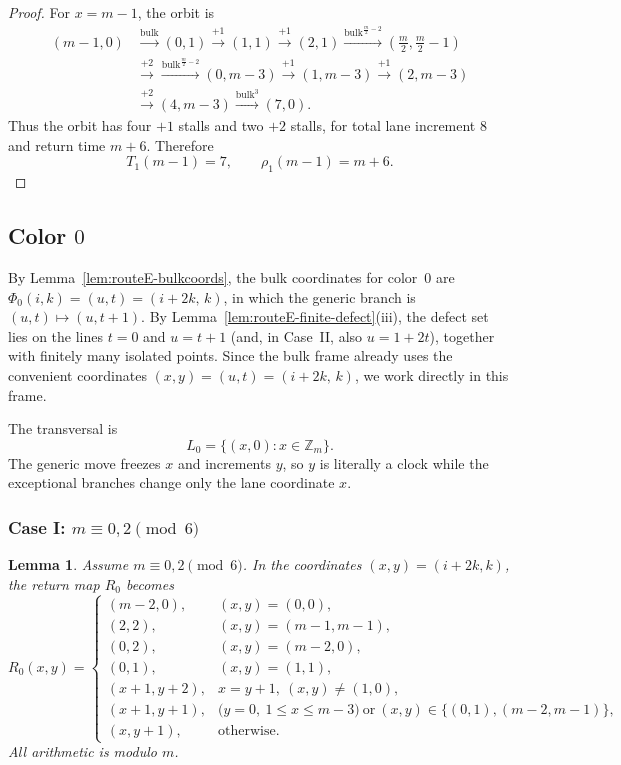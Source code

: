 \documentclass[11pt]{article}
\newtheorem{lemma}{Lemma}
\newcommand{\Zm}{\mathbb Z_m}
\newcommand{\bulk}{\mathrm{bulk}}   %
\begin{document}
\begin{proof}
For $x=m-1$, the orbit is
\[
\begin{aligned}
(m-1,0)&\xrightarrow{\bulk}(0,1)\xrightarrow{+1}(1,1)\xrightarrow{+1}(2,1)
\xrightarrow{\bulk^{\frac m2-2}}\left(\frac m2,\frac m2-1\right)\\
&\xrightarrow{+2}\xrightarrow{\bulk^{\frac m2-2}}(0,m-3)\xrightarrow{+1}(1,m-3)
\xrightarrow{+1}(2,m-3)\\
&\xrightarrow{+2}(4,m-3)\xrightarrow{\bulk^3}(7,0).
\end{aligned}
\]
Thus the orbit has four $+1$ stalls and two $+2$ stalls, for total lane increment $8$ and return time
$m+6$.
Therefore
\[
T_1(m-1)=7,\qquad \rho_1(m-1)=m+6.
\]
\end{proof}

\subsection{Color $0$}

By Lemma~\ref{lem:routeE-bulkcoords}, the bulk coordinates for color~$0$ are $\Phi_0(i,k)=(u,t)=(i+2k,\,k)$, in which the generic branch is $(u,t)\mapsto(u,t+1)$.
By Lemma~\ref{lem:routeE-finite-defect}\textup{(iii)}, the defect set lies on the lines $t=0$ and $u=t+1$ (and, in Case~II, also $u=1+2t$), together with finitely many isolated points.
Since the bulk frame already uses the convenient coordinates $(x,y)=(u,t)=(i+2k,\,k)$, we work directly in this frame.

The transversal is
\[
L_0=\{(x,0):x\in \Zm\}.
\]
The generic move freezes $x$ and increments $y$, so $y$ is literally a clock while the exceptional branches change only the lane coordinate $x$.

\subsubsection{Case I: $m\equiv 0,2\pmod 6$}

\begin{lemma}\label{lem:R0-caseI-xy}
Assume $m\equiv 0,2\pmod 6$.
In the coordinates $(x,y)=(i+2k,k)$, the return map $R_0$ becomes
\[
R_0(x,y)=
\begin{cases}
(m-2,0),&(x,y)=(0,0),\\
(2,2),&(x,y)=(m-1,m-1),\\
(0,2),&(x,y)=(m-2,0),\\
(0,1),&(x,y)=(1,1),\\
(x+1,y+2),&x=y+1,\ (x,y)\neq (1,0),\\
(x+1,y+1),&\bigl(y=0,\ 1\le x\le m-3\bigr)\ \text{or}\ (x,y)\in\{(0,1),(m-2,m-1)\},\\
(x,y+1),&\text{otherwise}.
\end{cases}
\]
All arithmetic is modulo $m$.
\end{lemma}
\end{document}
